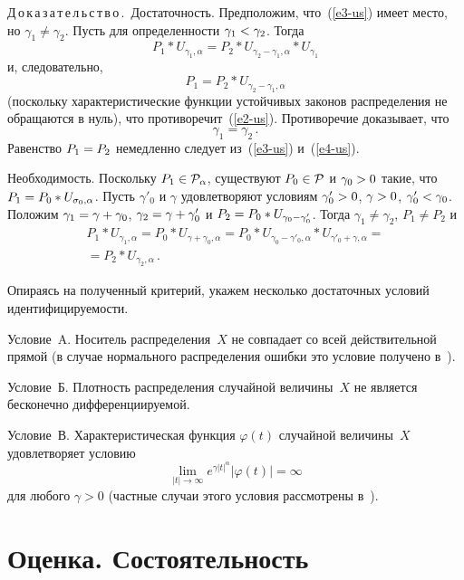 \begin{multicols}{2}

\noindent
Д\,о\,к\,а\,з\,а\,т\,е\,л\,ь\,с\,т\,в\,о\,.\ Достаточность. Предположим, что~(\ref{e3-us}) имеет
место, но $\gamma_1\not=\gamma_2$. Пусть для определенности
$\gamma_1\hm<\gamma_2$. Тогда
$$
P_1\ast U_{\gamma_1,\alpha}= P_2\ast U_{\gamma_2-\gamma_1,\alpha}\ast U_{\gamma_1}
$$
и, следовательно,
$$
P_1=P_2\ast U_{\gamma_2-\gamma_1,\alpha}
$$
(поскольку характеристические функции устойчивых законов распределения не
обращаются в нуль),
что противоречит~(\ref{e2-us}). Противоречие доказывает, что
\begin{equation}
\gamma_1=\gamma_2\,.\label{e4-us}
\end{equation}
Равенство $P_1\hm=P_2$ немедленно следует из~(\ref{e3-us}) и~(\ref{e4-us}).

\smallskip

Необходимость. Поскольку
$P_1\in{\cal P}_\alpha$, существуют $P_0\hm\in{\cal P}$ и $\gamma_0\hm>0$
такие, что $P_1\hm=P_0\ast U_{\sigma_0,\alpha}$.
Пусть $\gamma'_0$ и $\gamma$ удовлетворяют условиям $\gamma'_0\hm>0$,
$\gamma\hm>0$, $\gamma'_0\hm<\gamma_0$. Положим $\gamma_1\hm=\gamma\hm+\gamma_0$,
$\gamma_2\hm=\gamma\hm+\gamma'_0$ и $P_2\hm=P_0\ast U_{\gamma_0-\gamma'_0}$.
Тогда $\gamma_1\not=\gamma_2$, $P_1\not=P_2$ и
\begin{multline*}
P_1\ast U_{\gamma_1,\alpha}=P_0\ast U_{\gamma+\gamma_0,\alpha}=
P_0\ast U_{\gamma_0-\gamma'_0,\alpha}\ast U_{\gamma'_0+\gamma,\alpha}={}\\
{}=
P_2\ast U_{\gamma_2,\alpha}\,.
\end{multline*}

Опираясь на полученный критерий, укажем несколько достаточных условий
идентифициру\-емости.

\smallskip

Условие~A. Носитель распределения~$X$ не совпадает со всей действительной
прямой (в случае нормального распределения ошибки это условие получено в~\cite{2-us}).

\smallskip

Условие~Б. Плотность распределения случайной величины~$X$ не является
бесконечно дифференциируемой.

\smallskip

Условие~В. Характеристическая функция $\varphi(t)$ случайной величины~$X$ 
удовлетворяет условию
$$
\lim\limits_{|t|\to\infty} e^{\gamma|t|^\alpha}|\varphi(t)|=\infty
$$
для любого $\gamma>0$ (частные случаи этого условия рассмотрены в~\cite{3-us}).

\section{Оценка. Состоятельность}


\end{multicols}
